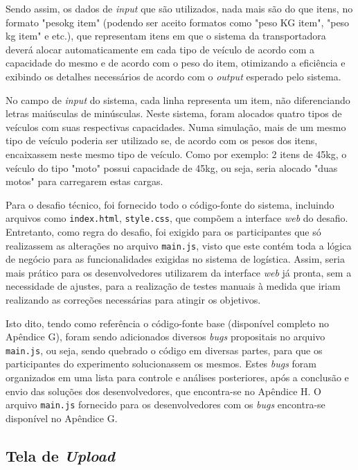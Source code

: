 \documentclass[english,brazilian]{UNISINOSartigo} %
\begin{document}
Sendo assim, os dados de \textit{input} que são utilizados, nada mais são do que itens, no formato "pesokg item" (podendo ser aceito formatos como "peso KG item", "peso kg item" e etc.), que representam itens em que o sistema da transportadora deverá alocar automaticamente em cada tipo de veículo de acordo com a capacidade do mesmo e de acordo com o peso do item, otimizando a eficiência e exibindo os detalhes necessários de acordo com o \textit{output} esperado pelo sistema.

No campo de \textit{input} do sistema, cada linha representa um item, não diferenciando letras maiúsculas de minúsculas. Neste sistema, foram alocados quatro tipos de veículos com suas respectivas capacidades. Numa simulação, mais de um mesmo tipo de veículo poderia ser utilizado se, de acordo com os pesos dos itens, encaixassem neste mesmo tipo de veículo. Como por exemplo: 2 itens de 45kg, o veículo do tipo "moto" possui capacidade de 45kg, ou seja, seria alocado "duas motos" para carregarem estas cargas.

Para o desafio técnico, foi fornecido todo o código-fonte do sistema, incluindo arquivos como \texttt{index.html}, \texttt{style.css}, que compõem a interface \textit{web} do desafio. Entretanto, como regra do desafio, foi exigido para os participantes que só realizassem as alterações no arquivo \texttt{main.js}, visto que este contém toda a lógica de negócio para as funcionalidades exigidas no sistema de logística. Assim, seria mais prático para os desenvolvedores utilizarem da interface \textit{web} já pronta, sem a necessidade de ajustes, para a realização de testes manuais à medida que iriam realizando as correções necessárias para atingir os objetivos.

Isto dito, tendo como referência o código-fonte base (disponível completo no Apêndice G), foram sendo adicionados diversos \textit{bugs} propositais no arquivo \texttt{main.js}, ou seja, sendo quebrado o código em diversas partes, para que os participantes do experimento solucionassem os mesmos. Estes \textit{bugs} foram organizados em uma lista para controle e análises posteriores, após a conclusão e envio das soluções dos desenvolvedores, que encontra-se no Apêndice H. O arquivo \texttt{main.js} fornecido para os desenvolvedores com os \textit{bugs} encontra-se disponível no Apêndice G.

\subsection{Tela de \textit{Upload}}
\end{document}
